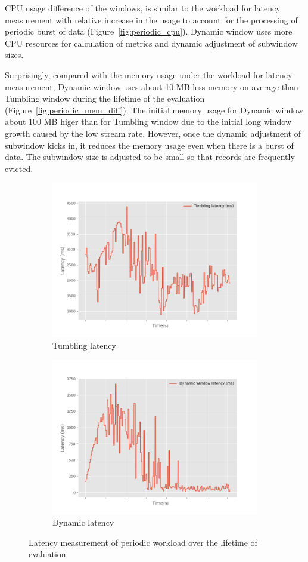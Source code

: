 CPU usage difference of the windows, is similar to the workload for latency measurement with relative increase 
in the usage to account for the processing of periodic burst of data
(Figure~\ref{fig:periodic_cpu}). Dynamic window uses more CPU resources for 
calculation of metrics and dynamic adjustment of subwindow sizes. 

Surprisingly, compared with the memory usage under the workload for latency measurement, Dynamic window uses 
about 10 MB less memory on average than Tumbling window during the lifetime of the evaluation (Figure~\ref{fig:periodic_mem_diff}). 
The initial memory usage for Dynamic window about 100 MB higer than for Tumbling window due to the initial long window growth 
caused by the low stream rate. However, once 
the dynamic adjustment of subwindow kicks in, it reduces the memory usage even when there is a burst of data. The subwindow size
is adjusted to be small so that records are frequently evicted. 


\begin{figure}
    \begin{subfigure}[b]{\columnwidth}
        \centering
        \includegraphics[width=0.7\columnwidth]{fig/periodic/Tumbling_latency_lineplot.png}
        \caption{Tumbling latency }
        \label{fig:periodic_tumbling_lineplot}
    \end{subfigure}

    \begin{subfigure}[b]{\columnwidth}
        \centering
        \includegraphics[width=0.7\columnwidth]{fig/periodic/DynamicWindow_latency_lineplot.png}
        \caption{Dynamic latency }
        \label{fig:periodic_dynamic_lineplot}
    \end{subfigure}
    \caption{Latency measurement of periodic workload over the lifetime of evaluation}
    \label{fig:periodic_latency_lineplot}
\end{figure}

